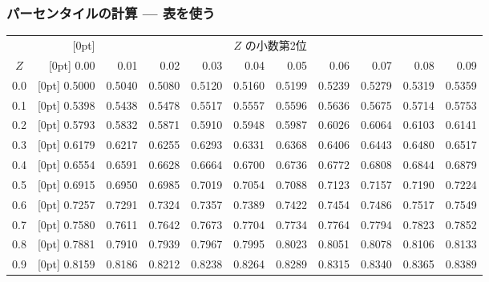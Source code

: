 
\begin{frame}[fragile]
\frametitle{パーセンタイルの計算 --- 表を使う}

{\footnotesize
\begin{tabular}{c | >{\columncolor[gray]{0.6}[0pt]}rrrrr | rrrrr |}
  \cline{2-11}
&&&& \multicolumn{4}{c}{$Z$ の小数第2位} &&& \\
  \cline{2-11}
$Z$ & 0.00 & 0.01 & 0.02 & 0.03 & 0.04 & 0.05 & 0.06 & 0.07 & 0.08 & 0.09 \\
  \hline
  \hline
0.0 & \tiny{0.5000} & \tiny{0.5040} & \tiny{0.5080} & \tiny{0.5120} & \tiny{0.5160} & \tiny{0.5199} & \tiny{0.5239} & \tiny{0.5279} & \tiny{0.5319} & \tiny{0.5359} \\
  0.1 & \tiny{0.5398} & \tiny{0.5438} & \tiny{0.5478} & \tiny{0.5517} & \tiny{0.5557} & \tiny{0.5596} & \tiny{0.5636} & \tiny{0.5675} & \tiny{0.5714} & \tiny{0.5753} \\
  0.2 & \tiny{0.5793} & \tiny{0.5832} & \tiny{0.5871} & \tiny{0.5910} & \tiny{0.5948} & \tiny{0.5987} & \tiny{0.6026} & \tiny{0.6064} & \tiny{0.6103} & \tiny{0.6141} \\
  0.3 & \tiny{0.6179} & \tiny{0.6217} & \tiny{0.6255} & \tiny{0.6293} & \tiny{0.6331} & \tiny{0.6368} & \tiny{0.6406} & \tiny{0.6443} & \tiny{0.6480} & \tiny{0.6517} \\
  0.4 & \tiny{0.6554} & \tiny{0.6591} & \tiny{0.6628} & \tiny{0.6664} & \tiny{0.6700} & \tiny{0.6736} & \tiny{0.6772} & \tiny{0.6808} & \tiny{0.6844} & \tiny{0.6879} \\
  \hline
  0.5 & \tiny{0.6915} & \tiny{0.6950} & \tiny{0.6985} & \tiny{0.7019} & \tiny{0.7054} & \tiny{0.7088} & \tiny{0.7123} & \tiny{0.7157} & \tiny{0.7190} & \tiny{0.7224} \\
  0.6 & \tiny{0.7257} & \tiny{0.7291} & \tiny{0.7324} & \tiny{0.7357} & \tiny{0.7389} & \tiny{0.7422} & \tiny{0.7454} & \tiny{0.7486} & \tiny{0.7517} & \tiny{0.7549} \\
  0.7 & \tiny{0.7580} & \tiny{0.7611} & \tiny{0.7642} & \tiny{0.7673} & \tiny{0.7704} & \tiny{0.7734} & \tiny{0.7764} & \tiny{0.7794} & \tiny{0.7823} & \tiny{0.7852} \\
  0.8 & \tiny{0.7881} & \tiny{0.7910} & \tiny{0.7939} & \tiny{0.7967} & \tiny{0.7995} & \tiny{0.8023} & \tiny{0.8051} & \tiny{0.8078} & \tiny{0.8106} & \tiny{0.8133} \\
  0.9 & \tiny{0.8159} & \tiny{0.8186} & \tiny{0.8212} & \tiny{0.8238} & \tiny{0.8264} & \tiny{0.8289} & \tiny{0.8315} & \tiny{0.8340} & \tiny{0.8365} & \tiny{0.8389} \\

\end{tabular}}
\end{frame}
